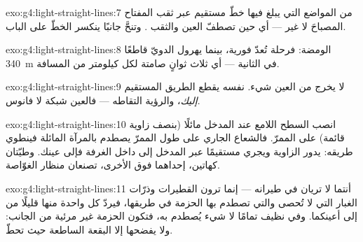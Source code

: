 \begin{solution}{exo:g4:light-straight-lines:7}
من المواضع التي يبلغ فيها خطّ مستقيم عبر ثقب المفتاح المصباحَ
لا غير --- أي حين تصطفّ العين والثقب . وتنحَّ جانبًا
ينكسر الخطّ على الباب.
\end{solution}

\begin{solution}{exo:g4:light-straight-lines:8}
الومضة: فرحلة  تُعدّ فورية، بينما يهرول الدويّ قاطعًا
\qty{340}{m} في الثانية --- أي ثلاث ثوانٍ صامتة لكل كيلومتر من
المسافة.
\end{solution}

\begin{solution}{exo:g4:light-straight-lines:9}
لا يخرج من العين شيء.   نفسه يقطع الطريق المستقيم
\emph{إليك}، والرؤية التقاطه --- فالعين شبكة لا فانوس.
\end{solution}

\begin{solution}{exo:g4:light-straight-lines:10}
انصب السطح اللامع عند المدخل مائلًا (بنصف زاوية قائمة) على
الممرّ. فالشعاع الجاري على طول الممرّ يصطدم بالمرآة المائلة
فينطوي طريقه: يدور الزاوية ويجري مستقيمًا عبر المدخل إلى داخل
الغرفة فإلى عينك. وطيّتان كهاتين، إحداهما فوق الأخرى، تصنعان
منظار الغوّاصة.
\end{solution}

\begin{solution}{exo:g4:light-straight-lines:11}
أنتما لا تريان  في طيرانه --- إنما ترون القطيرات وذرّات
الغبار التي لا تُحصى والتي تصطدم بها الحزمة في طريقها، فيردّ
كل واحدة منها قليلًا من  إلى أعينكما. وفي  نظيف تمامًا
لا شيء يُصطدم به، فتكون الحزمة غير مرئية من الجانب: ولا يفضحها
إلا البقعة الساطعة حيث تحطّ.
\end{solution}
